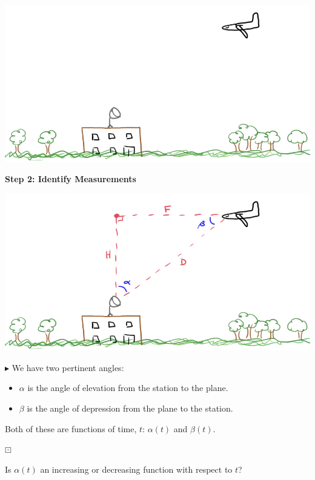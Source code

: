 \documentclass{ximera}
\begin{document}
\begin{image}
\includegraphics{pics/plane_1.png}
\end{image}




\textbf{\textcolor{purple!85!blue}{Step 2: Identify Measurements}}



\begin{image}
\includegraphics{pics/plane_3.png}
\end{image}



$\blacktriangleright$ We have two pertinent angles:

\begin{itemize}
\item $\alpha$ is the angle of elevation from the station to the plane.
\item $\beta$ is the angle of depression from the plane to the station.
\end{itemize}

Both of these are functions of time, $t$: $\alpha(t)$ and $\beta(t)$.






\begin{question} $\boxdot$ 

Is $\alpha(t)$ an increasing or decreasing function with respect to $t$?

\begin{multipleChoice}
\end{multipleChoice}

\end{question}
\end{document}
